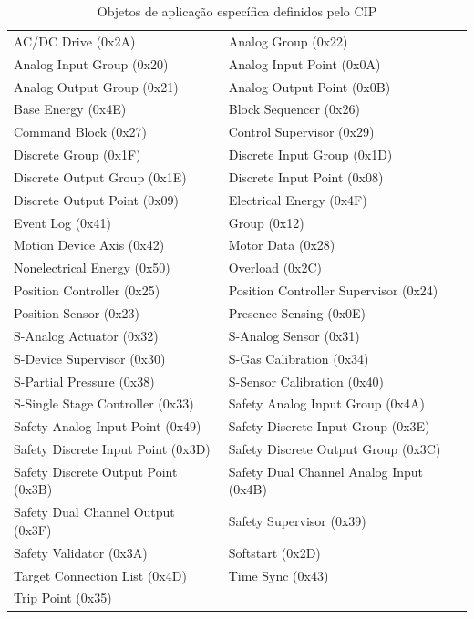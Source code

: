 \begin{table}[H]
\begin{center}
\begin{tabular}{ll}
\hline
AC/DC Drive (0x2A) & Analog Group (0x22)\\
Analog Input Group (0x20)& Analog Input Point (0x0A)\\
Analog Output Group (0x21)& Analog Output Point (0x0B)\\
Base Energy (0x4E)&Block Sequencer (0x26)\\
Command Block (0x27)&Control Supervisor (0x29)\\
Discrete Group (0x1F)&Discrete Input Group (0x1D)\\
Discrete Output Group (0x1E)&Discrete Input Point (0x08)\\
Discrete Output Point (0x09)&Electrical Energy (0x4F)\\
Event Log (0x41)&Group (0x12)\\
Motion Device Axis (0x42)&Motor Data (0x28)\\
Nonelectrical Energy (0x50)&Overload (0x2C)\\
Position Controller (0x25)&Position Controller Supervisor (0x24)\\
Position Sensor (0x23)&Presence Sensing (0x0E)\\
S-Analog Actuator (0x32)&S-Analog Sensor (0x31)\\
S-Device Supervisor (0x30)&S-Gas Calibration (0x34)\\
S-Partial Pressure (0x38)&S-Sensor Calibration (0x40)\\
S-Single Stage Controller (0x33)&Safety Analog Input Group (0x4A)\\
Safety Analog Input Point (0x49)&Safety Discrete Input Group (0x3E)\\
Safety Discrete Input Point (0x3D)&Safety Discrete Output Group (0x3C)\\
Safety Discrete Output Point (0x3B)&Safety Dual Channel Analog Input (0x4B)\\
Safety Dual Channel Output (0x3F)&Safety Supervisor (0x39)\\
Safety Validator (0x3A)&Softstart (0x2D)\\
Target Connection List (0x4D)&Time Sync (0x43)\\
Trip Point (0x35)&\\\hline
\end{tabular}
\end{center}
\caption{Objetos de aplicação específica definidos pelo CIP}
\label{tab::objesp}
\end{table}
 
